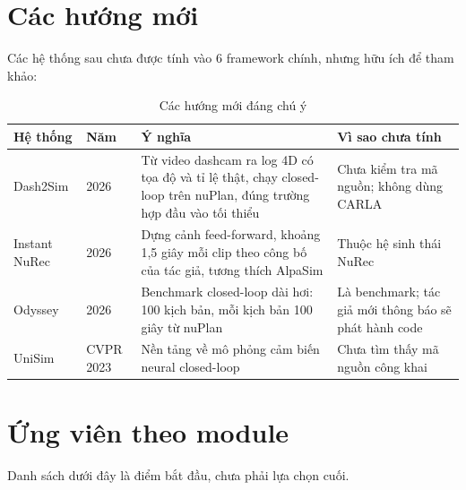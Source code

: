 \section{Các hướng mới}

Các hệ thống sau chưa được tính vào 6 framework chính, nhưng hữu ích để tham khảo:

\begin{table}[H]
  \centering
  \small
  \caption{Các hướng mới đáng chú ý}
  \begin{tabularx}{\linewidth}{>{\raggedright\arraybackslash}p{2.3cm} l >{\raggedright\arraybackslash}X >{\raggedright\arraybackslash}X}
    \toprule
    \textbf{Hệ thống} & \textbf{Năm} & \textbf{Ý nghĩa} & \textbf{Vì sao chưa tính} \\
    \midrule
    Dash2Sim & 2026 & Từ video dashcam ra log 4D có tọa độ và tỉ lệ thật, chạy closed-loop trên nuPlan, đúng trường hợp đầu vào tối thiểu & Chưa kiểm tra mã nguồn; không dùng CARLA \\
    \addlinespace
    Instant NuRec & 2026 & Dựng cảnh feed-forward, khoảng 1,5 giây mỗi clip theo công bố của tác giả, tương thích AlpaSim & Thuộc hệ sinh thái NuRec \\
    \addlinespace
    Odyssey & 2026 & Benchmark closed-loop dài hơi: 100 kịch bản, mỗi kịch bản 100 giây từ nuPlan & Là benchmark; tác giả mới thông báo sẽ phát hành code \\
    \addlinespace
    UniSim & CVPR 2023 & Nền tảng về mô phỏng cảm biến neural closed-loop & Chưa tìm thấy mã nguồn công khai \\
    \bottomrule
  \end{tabularx}
\end{table}

\section{Ứng viên theo module}

Danh sách dưới đây là điểm bắt đầu, chưa phải lựa chọn cuối.

